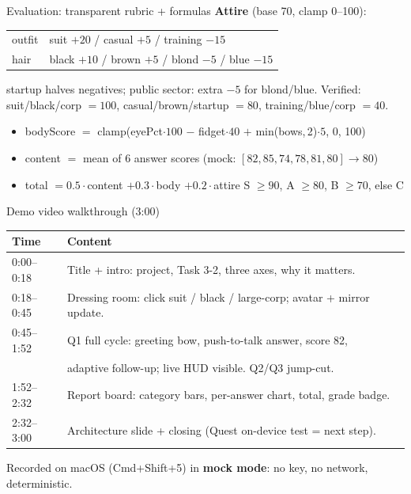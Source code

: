 \documentclass{beamer}
\begin{document}
\begin{frame}{Evaluation: transparent rubric + formulas}
  \textbf{Attire} (base 70, clamp 0--100):
  \begin{center}\small
  \begin{tabular}{ll}
    \toprule
    outfit & suit \(+20\) / casual \(+5\) / training \(-15\) \\
    hair & black \(+10\) / brown \(+5\) / blond \(-5\) / blue \(-15\) \\
    \bottomrule
  \end{tabular}
  \end{center}
  startup halves negatives; public sector: extra \(-5\) for blond/blue.
  Verified: suit/black/corp \(=100\), casual/brown/startup \(=80\), training/blue/corp \(=40\).
  \bigskip
  \begin{itemize}\small
    \item bodyScore \(=\) clamp(eyePct\(\cdot 100\) \(-\) fidget\(\cdot 40\) \(+\) min(bows,\,2)\(\cdot 5\), 0, 100)
    \item content \(=\) mean of 6 answer scores (mock: \([82,85,74,78,81,80]\to80\))
    \item total \(=0.5\cdot\)content \(+0.3\cdot\)body \(+0.2\cdot\)attire \quad S \(\ge90\), A \(\ge80\), B \(\ge70\), else C
  \end{itemize}
\end{frame}

\begin{frame}{Demo video walkthrough (3:00)}
  \begin{center}\small
  \begin{tabular}{@{}lp{}@{}}
    \toprule
    Time & Content \\
    \midrule
    0:00--0:18 & Title + intro: project, Task 3-2, three axes, why it matters. \\
    0:18--0:45 & Dressing room: click suit / black / large-corp; avatar + mirror update. \\
    0:45--1:52 & Q1 full cycle: greeting bow, push-to-talk answer, score 82, \\
               & adaptive follow-up; live HUD visible. Q2/Q3 jump-cut. \\
    1:52--2:32 & Report board: category bars, per-answer chart, total, grade badge. \\
    2:32--3:00 & Architecture slide + closing (Quest on-device test = next step). \\
    \bottomrule
  \end{tabular}
  \end{center}
  \bigskip
  Recorded on macOS (Cmd+Shift+5) in \textbf{mock mode}: no key, no network, deterministic.
\end{frame}
\end{document}
